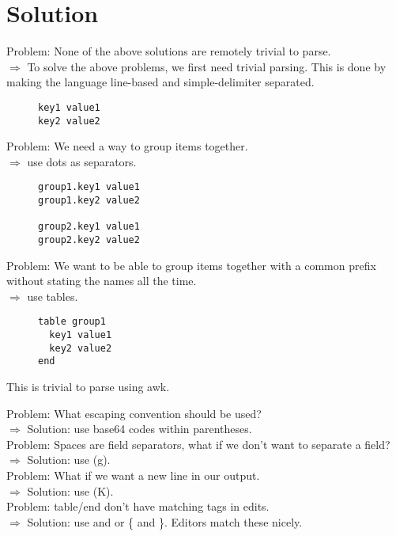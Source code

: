\documentclass[listof=totoc]{article}
\begin{document}
\section{Solution}
\noindent Problem: None of the above solutions are remotely trivial to parse. \\
$\Rightarrow$ To solve the above problems, we first need trivial parsing. This is done by making the language line-based and simple-delimiter separated.


\begin{figure}[H]
\centering
\begin{varwidth}{\linewidth}
\begin{verbatim}
key1 value1
key2 value2
\end{verbatim}
\end{varwidth}
\caption{}
\end{figure}

\noindent Problem: We need a way to group items together. \\
$\Rightarrow$ use dots as separators.


\begin{figure}[H]
\centering
\begin{varwidth}{\linewidth}
\begin{verbatim}
group1.key1 value1
group1.key2 value2

group2.key1 value1
group2.key2 value2
\end{verbatim}
\end{varwidth}
\caption{}
\end{figure}

\noindent Problem: We want to be able to group items together with a common prefix without stating the names all the time. \\
$\Rightarrow$ use tables.


\begin{figure}[H]
\centering
\begin{varwidth}{\linewidth}
\begin{verbatim}
table group1
  key1 value1
  key2 value2
end
\end{verbatim}
\end{varwidth}
\caption{}
\end{figure}

\noindent This is trivial to parse using awk.

\noindent Problem: What escaping convention should be used? \\
$\Rightarrow$ Solution: use base64 codes within parentheses. \\
Problem: Spaces are field separators, what if we don't want to separate a field? \\
$\Rightarrow$ Solution: use (g). \\
Problem: What if we want a new line in our output. \\
$\Rightarrow$ Solution: use (K). \\
Problem: table/end don't have matching tags in edits. \\
$\Rightarrow$ Solution: use \lbrack and \rbrack or \{ and \}. Editors match these nicely.
\end{document}

